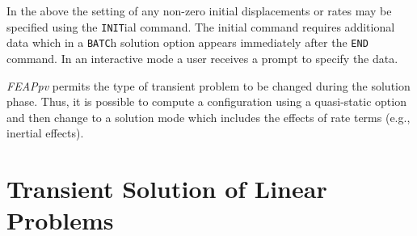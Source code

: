 \begin{enumerate}
In the above the setting of any non-zero initial displacements or rates
may be specified using the {\tt INIT}ial command.  The initial command
requires additional data which in a {\tt BATC}h solution option appears
immediately after the {\tt END} command.  In an interactive mode a user
receives a prompt to specify the data.
\end{enumerate}

{\sl FEAPpv} permits the type of transient problem
to be changed during the solution phase.  Thus, it is possible to
compute a configuration using a quasi-static option and then change
to a solution mode which includes the effects of rate terms (e.g.,
inertial effects).

\section{Transient Solution of Linear Problems}
\label{tranlin}

